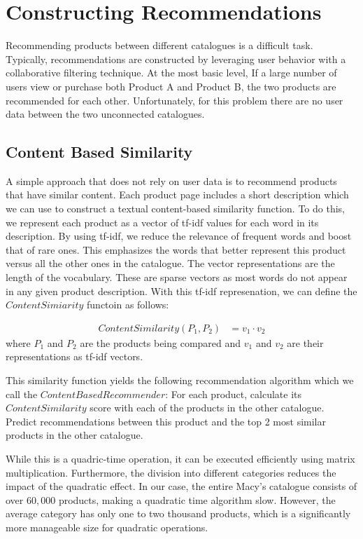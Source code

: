 \documentclass[11pt]{article}
\begin{document}
\section*{Constructing Recommendations}
Recommending products between different catalogues is a difficult task.
Typically, recommendations are constructed by leveraging user behavior
with a collaborative filtering technique. At the most basic level, If a large
number of users view or purchase both Product A and Product B, the two products
are recommended for each other. Unfortunately, for this problem there are no
user data between the two unconnected catalogues.

\subsection*{Content Based Similarity}
A simple approach that does not rely on user data is to recommend products that
have similar content. Each product page includes a short description which we 
can use to construct a textual content-based similarity function. To do this, 
we represent each product as a vector of tf-idf values for each word in its 
description. By using tf-idf, we reduce the relevance of frequent words and 
boost that of rare ones. This emphasizes the words that better represent this 
product versus all the other ones in the catalogue. The vector representations 
are the length of the vocabulary. These are sparse vectors as most words do 
not appear in any given product description. With this tf-idf represenation,
we can define the $ContentSimiarity$ functoin as follows:

\begin{align}
ContentSimilarity(P_1, P_2) &= v_1 \cdot v_2
\end{align}
where $P_1$ and $P_2$ are the products being compared and $v_1$ and $v_2$ are
their representations as tf-idf vectors.

This similarity function yields the following recommendation algorithm which we
call the $ContentBased Recommender$: For each product, calculate its
$ContentSimilarity$ score with each of the products in the other catalogue.
Predict recommendations between this product and the top 2 most similar products 
in the other catalogue.  

While this is a quadric-time operation, it can be executed efficiently using 
matrix multiplication. Furthermore, the division into different categories 
reduces the impact of the quadratic effect. In our case, the entire Macy's 
catalogue consists of over $60,000$ products, making a quadratic time algorithm 
slow. However, the average category has only one to two thousand products, which
is a significantly more manageable size for quadratic operations.
\end{document}
